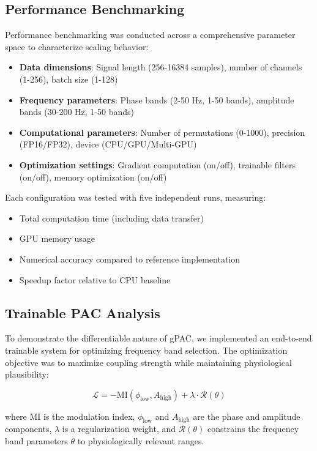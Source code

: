 \subsection{Performance Benchmarking}
Performance benchmarking was conducted across a comprehensive parameter space to characterize scaling behavior:

\begin{itemize}
\item \textbf{Data dimensions}: Signal length (256-16384 samples), number of channels (1-256), batch size (1-128)
\item \textbf{Frequency parameters}: Phase bands (2-50 Hz, 1-50 bands), amplitude bands (30-200 Hz, 1-50 bands)
\item \textbf{Computational parameters}: Number of permutations (0-1000), precision (FP16/FP32), device (CPU/GPU/Multi-GPU)
\item \textbf{Optimization settings}: Gradient computation (on/off), trainable filters (on/off), memory optimization (on/off)
\end{itemize}

Each configuration was tested with five independent runs, measuring:
\begin{itemize}
\item Total computation time (including data transfer)
\item GPU memory usage
\item Numerical accuracy compared to reference implementation
\item Speedup factor relative to CPU baseline
\end{itemize}

\subsection{Trainable PAC Analysis}
To demonstrate the differentiable nature of gPAC, we implemented an end-to-end trainable system for optimizing frequency band selection. The optimization objective was to maximize coupling strength while maintaining physiological plausibility:

\begin{equation}
\mathcal{L} = -\text{MI}(\phi_{\text{low}}, A_{\text{high}}) + \lambda \cdot \mathcal{R}(\theta)
\end{equation}

where MI is the modulation index, $\phi_{\text{low}}$ and $A_{\text{high}}$ are the phase and amplitude components, $\lambda$ is a regularization weight, and $\mathcal{R}(\theta)$ constrains the frequency band parameters $\theta$ to physiologically relevant ranges.

